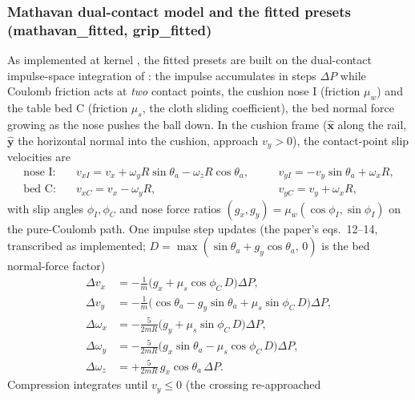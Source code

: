\subsubsection{Mathavan dual-contact model and the fitted presets
(mathavan\_fitted, grip\_fitted)}
\label{sec:appendix-eq-mathavan}

As implemented at kernel , the fitted presets are
built on the dual-contact impulse-space integration of
\citet{mathavan2010cushion}: the impulse accumulates in steps
$\Delta P$ while Coulomb friction acts at \emph{two} contact points,
the cushion nose I (friction $\mu_w$) and the table bed C (friction
$\mu_s$, the cloth sliding coefficient), the bed normal force growing
as the nose pushes the ball down. In the cushion frame
($\hat{\mathbf{x}}$ along the rail, $\hat{\mathbf{y}}$ the horizontal
normal into the cushion, approach $v_y > 0$), the contact-point slip
velocities are
\begin{equation}
\begin{aligned}
\text{nose I:}\quad &v_{xI} = v_x + \omega_y R\sin\theta_a -
\omega_z R\cos\theta_a, &\quad
&v_{yI} = -v_y\sin\theta_a + \omega_x R,\\
\text{bed C:}\quad &v_{xC} = v_x - \omega_y R, &
&v_{yC} = v_y + \omega_x R,
\end{aligned}
\label{eq:mathavan-slips}
\end{equation}
with slip angles $\phi_I, \phi_C$ and nose force ratios
$(g_x, g_y) = \mu_w(\cos\phi_I, \sin\phi_I)$ on the pure-Coulomb path.
One impulse step updates (the paper's eqs.~12--14, transcribed as
implemented; $D = \max(\sin\theta_a + g_y\cos\theta_a,\, 0)$ is the
bed normal-force factor)
\begin{equation}
\begin{aligned}
\Delta v_x &= -\tfrac{1}{m}\bigl(g_x +
\mu_s\cos\phi_C\,D\bigr)\Delta P,\\
\Delta v_y &= -\tfrac{1}{m}\bigl(\cos\theta_a - g_y \sin\theta_a +
\mu_s\sin\phi_C\,D\bigr)\Delta P,\\
\Delta \omega_x &= -\tfrac{5}{2mR}\bigl(g_y +
\mu_s\sin\phi_C\,D\bigr)\Delta P,\\
\Delta \omega_y &= -\tfrac{5}{2mR}\bigl(g_x\sin\theta_a -
\mu_s\cos\phi_C\,D\bigr)\Delta P,\\
\Delta \omega_z &= +\tfrac{5}{2mR}\,g_x\cos\theta_a\,\Delta P .
\end{aligned}
\label{eq:mathavan-step}
\end{equation}
Compression integrates until $v_y \le 0$ (the crossing re-approached
